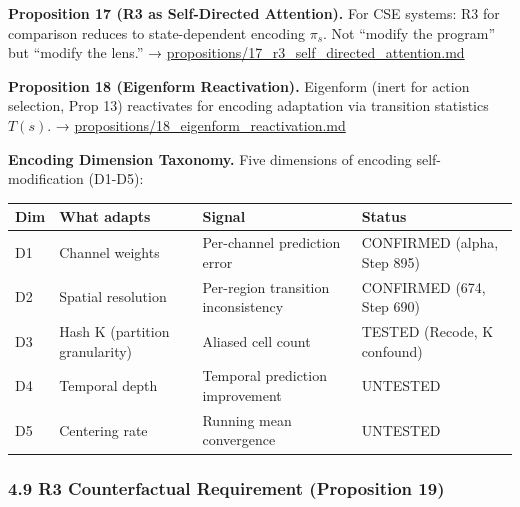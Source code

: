 \documentclass[
  11pt,
]{article}
\newcounter{none} %
\begin{document}
\textbf{Proposition 17 (R3 as Self-Directed Attention).} For CSE
systems: R3 for comparison reduces to state-dependent encoding
\(\pi_s\). Not ``modify the program'' but ``modify the lens.'' →
\url{propositions/17_r3_self_directed_attention.md}

\textbf{Proposition 18 (Eigenform Reactivation).} Eigenform (inert for
action selection, Prop 13) reactivates for encoding adaptation via
transition statistics \(T(s)\). →
\url{propositions/18_eigenform_reactivation.md}

\textbf{Encoding Dimension Taxonomy.} Five dimensions of encoding
self-modification (D1-D5):

{\def\LTcaptype{none} %
\begin{longtable}[]{@{}
  >{\raggedright\arraybackslash}p{}
  >{\raggedright\arraybackslash}p{}
  >{\raggedright\arraybackslash}p{}
  >{\raggedright\arraybackslash}p{}@{}}
\toprule\noalign{}
\begin{minipage}[b]{\linewidth}\raggedright
Dim
\end{minipage} & \begin{minipage}[b]{\linewidth}\raggedright
What adapts
\end{minipage} & \begin{minipage}[b]{\linewidth}\raggedright
Signal
\end{minipage} & \begin{minipage}[b]{\linewidth}\raggedright
Status
\end{minipage} \\
\midrule\noalign{}
\endhead
\bottomrule\noalign{}
\endlastfoot
D1 & Channel weights & Per-channel prediction error & CONFIRMED (alpha,
Step 895) \\
D2 & Spatial resolution & Per-region transition inconsistency &
CONFIRMED (674, Step 690) \\
D3 & Hash K (partition granularity) & Aliased cell count & TESTED
(Recode, K confound) \\
D4 & Temporal depth & Temporal prediction improvement & UNTESTED \\
D5 & Centering rate & Running mean convergence & UNTESTED \\
\end{longtable}
}

\subsubsection{4.9 R3 Counterfactual Requirement (Proposition
19)}\label{r3-counterfactual-requirement-proposition-19}
\end{document}

